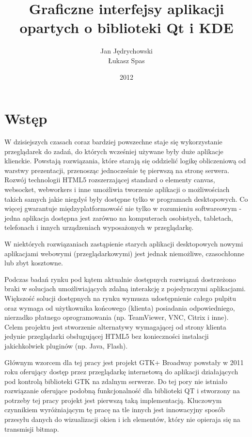 \documentclass[polish]{inz}
\title{Graficzne interfejsy aplikacji opartych o biblioteki Qt i KDE}
\author{Jan J\k{e}drychowski\\\L{}ukasz Spas}
\date{2012}
\begin{document}
\maketitle

\chapter{Wstęp}

W dzisiejszych czasach coraz bardziej powszechne staje się wykorzystanie przeglądarek do zadań, do których wcześniej używane były duże aplikacje klienckie. Powstają rozwiązania, które starają się oddzielić logikę obliczeniową od warstwy prezentacji, przenosząc jednocześnie tę pierwszą na stronę serwera. Rozwój technologii HTML5 rozszerzającej standard o elementy canvas, websocket, webworkers i inne umożliwia tworzenie aplikacji o możliwościach takich samych jakie niegdyś były dostępne tylko w programach desktopowych. Co więcej gwarantuje międzyplatformowość nie tylko w rozumieniu softwareowym - jedna aplikacja dostępna jest zarówno na komputerach osobistych, tabletach, telefonach i innych urządzeniach wyposażonych w przeglądarkę.

W niektórych rozwiązaniach zastąpienie starych aplikacji desktopowych nowymi aplikacjami webowymi (przeglądarkowymi) jest jednak niemożliwe, czasochłonne lub zbyt kosztowne.

Podczas badań rynku pod kątem aktualnie dostępnych rozwiązań dostrzeżono braki w solucjach umożliwiających zdalną interakcję z pojedynczymi aplikacjami. Większość solucji dostępnych na rynku wymusza udostępnienie całego pulpitu oraz wymaga od użytkownika końcowego (klienta) posiadania odpowiedniego, nierzadko płatnego oprogramowania (np. TeamViewer, VNC, Citrix i inne). Celem projektu jest stworzenie alternatywy wymagającej od strony klienta jedynie przeglądarki obsługującej HTML5 bez konieczności instalacji jakichkolwiek pluginów (np. Java, Flash).

Głównym wzorcem dla tej pracy jest projekt GTK+ Broadway powstały w 2011 roku oferujący dostęp przez przeglądarkę internetową do aplikacji działających pod kontrolą biblioteki GTK na zdalnym serwerze. Do tej pory nie istniało rozwiązanie oferujące podobną funkcjonalność dla biblioteki QT i stworzony na potrzeby tej pracy projekt jest pierwszą taką implementacją.
Kluczowym czynnikiem wyróżniającym tę pracę na tle innych jest innowacyjny sposób przesyłu danych do wizualizacji okien i ich elementów, który nie opieraja się na transmisji bitmap.
\end{document}
